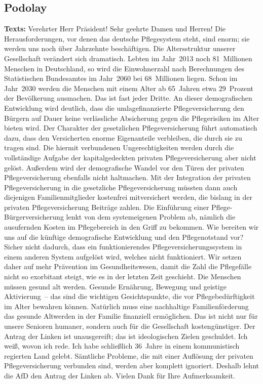 \documentclass{article}
\begin{document}
\subsection{Podolay}
\noindent\textbf{Texts:} Verehrter Herr Präsident! Sehr geehrte Damen und Herren! Die Herausforderungen, vor denen das deutsche Pflegesystem steht, sind enorm; sie werden uns noch über Jahrzehnte beschäftigen. Die Altersstruktur unserer Gesellschaft verändert sich dramatisch. Lebten im Jahr 2013 noch 81 Millionen Menschen in Deutschland, so wird die Einwohnerzahl nach Berechnungen des Statistischen Bundesamtes im Jahr 2060 bei 68 Millionen liegen. Schon im Jahr 2030 werden die Menschen mit einem Alter ab 65 Jahren etwa 29 Prozent der Bevölkerung ausmachen.  Das ist fast jeder Dritte. An dieser demografischen Entwicklung wird deutlich, dass die umlagefinanzierte Pflegeversicherung den Bürgern auf Dauer keine verlässliche Absicherung gegen die Pflegerisiken im Alter bieten wird. Der Charakter der gesetzlichen Pflegeversicherung führt automatisch dazu, dass den Versicherten enorme Eigenanteile verbleiben, die durch sie zu tragen sind. Die hiermit verbundenen Ungerechtigkeiten werden durch die vollständige Aufgabe der kapitalgedeckten privaten Pflegeversicherung aber nicht gelöst. Außerdem wird der demografische Wandel vor den Türen der privaten Pflegeversicherung ebenfalls nicht haltmachen. Mit der Integration der privaten Pflegeversicherung in die gesetzliche Pflegeversicherung müssten dann auch diejenigen Familienmitglieder kostenfrei mitversichert werden, die bislang in der privaten Pflegeversicherung Beiträge zahlen. Die Einführung einer Pflege-Bürgerversicherung lenkt von dem systemeigenen Problem ab, nämlich die ausufernden Kosten im Pflegebereich in den Griff zu bekommen. Wie bereiten wir uns auf die künftige demografische Entwicklung und den Pflegenotstand vor? Sicher nicht dadurch, dass ein funktionierendes Pflegeversicherungssystem in einem anderen System aufgelöst wird, welches nicht funktioniert. Wir setzen daher auf mehr Prävention im Gesundheitswesen, damit die Zahl die Pflegefälle nicht so exorbitant steigt, wie es in der letzten Zeit geschieht. Die Menschen müssen gesund alt werden. Gesunde Ernährung, Bewegung und geistige Aktivierung – das sind die wichtigen Gesichtspunkte, die vor Pflegebedürftigkeit im Alter bewahren können.  Natürlich muss eine nachhaltige Familienförderung das gesunde Altwerden in der Familie finanziell ermöglichen. Das ist nicht nur für unsere Senioren humaner, sondern auch für die Gesellschaft kostengünstiger. Der Antrag der Linken ist unausgereift; das ist ideologischen Zielen geschuldet. Ich weiß, wovon ich rede. Ich habe schließlich 36 Jahre in einem kommunistisch regierten Land gelebt.  Sämtliche Probleme, die mit einer Auflösung der privaten Pflegeversicherung verbunden sind, werden aber komplett ignoriert. Deshalb lehnt die AfD den Antrag der Linken ab. Vielen Dank für Ihre Aufmerksamkeit.  
\end{document}
